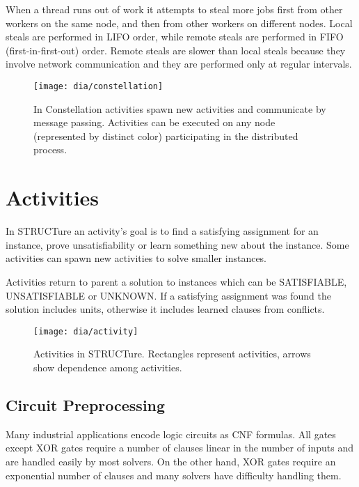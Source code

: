 When a thread runs out of work it attempts to steal more
jobs first from other workers on the same node, and then from
other workers on different nodes.  Local steals are performed
in LIFO order, while remote steals are performed in FIFO
(first-in-first-out) order. Remote steals are
slower than local steals because they involve network communication
and they are performed only at regular intervals.

\begin{figure}
  \centering
  \texttt{[image: dia/constellation]}
  \caption{In Constellation activities spawn new
  activities and communicate by message passing.
  Activities can be executed on any node (represented by
  distinct color) participating in the distributed process.}
  \label{fig:constellation}
\end{figure}


\section{Activities}

In STRUCTure an activity's goal is to find a satisfying assignment
for an instance, prove unsatisfiability or learn something new
about the instance. Some activities can spawn new activities to
solve smaller instances.

Activities return to parent a solution to instances which can be
\textsf{SATISFIABLE}, \textsf{UNSATISFIABLE} or \textsf{UNKNOWN}. If
a satisfying assignment was found the solution includes units,
otherwise it includes learned clauses from conflicts.

\begin{figure}
  \centering
  \texttt{[image: dia/activity]}
  \caption{Activities in STRUCTure. Rectangles represent activities, arrows
  show dependence among activities.}
  \label{fig:activities}
\end{figure}


\subsection{Circuit Preprocessing}

Many industrial applications encode logic circuits as CNF formulas.
All gates except XOR gates require a number of clauses linear in
the number of inputs and are handled easily by most solvers. On
the other hand, XOR gates require an exponential number of clauses
and many solvers have difficulty handling them.

